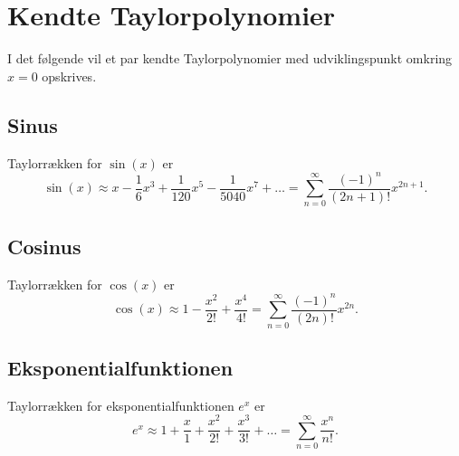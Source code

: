 \section{Kendte Taylorpolynomier}
I det følgende vil et par kendte Taylorpolynomier med udviklingspunkt omkring $x = 0$ opskrives.

\subsection{Sinus}
Taylorrækken for $\sin(x)$ er
\[ 
\sin(x)\approx x - \frac{1}{6}x^3 + \frac{1}{120}x^{5} - \frac{1}{5040}x^{7} + \ldots  = \sum_{n = 0}^{\infty} \frac{(-1)^{n}}{(2n+1)!}x^{2n+1}
.\]

\subsection{Cosinus}
Taylorrækken for $\cos(x)$ er
\[ 
\cos(x) \approx 1 - \frac{x^2}{2!} + \frac{x^{4}}{4!} = \sum_{n = 0}^{\infty} \frac{(-1)^{n}}{(2n)!}x^{2n}
.\]


\subsection{Eksponentialfunktionen}
Taylorrækken for eksponentialfunktionen $e^{x}$ er
\[ 
e^{x} \approx 1 + \frac{x}{1} + \frac{x^2}{2!} + \frac{x^3}{3!} + \ldots = \sum_{n = 0}^{\infty} \frac{x^{n}}{n!}
.\]
